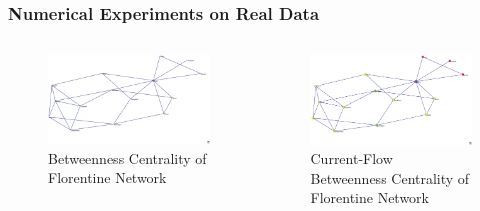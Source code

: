 \documentclass{beamer}
\begin{document}
\begin{frame}
\frametitle{Numerical Experiments on Real Data}
\begin{columns}[T]
\begin{column}{.5\textwidth}
\begin{figure}[h]
\begin{center}
\includegraphics[width=0.76\columnwidth]{FlorentineBetweenness2}
\end{center}
\caption{Betweenness Centrality of Florentine Network}
\label{fig:Betweenness Centrality - Florentine}
\end{figure}
\end{column}
\begin{column}{.5\textwidth}
\begin{figure}[h]
\begin{center}
\includegraphics[width=0.76\columnwidth]{florentine_current_flow_betweenness2}
\end{center}
\caption{Current-Flow Betweenness Centrality of Florentine Network}
\label{fig:Current Flow Betweenness Centrality - Florentine}
\end{figure}
\end{column}
\end{columns}
\end{frame}
\end{document}
